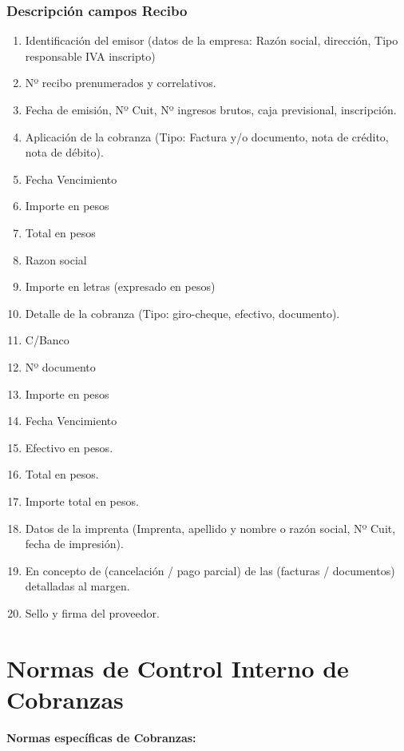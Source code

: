 \subsubsection{Descripci\'on campos Recibo}
\begin{enumerate}
\item Identificación del emisor (datos de la empresa: Razón social, dirección, Tipo responsable IVA inscripto)
\item Nº recibo prenumerados y correlativos.
\item Fecha de emisión, Nº Cuit, Nº ingresos brutos, caja previsional, inscripción.
\item Aplicación de la cobranza (Tipo: Factura y/o documento, nota de crédito, nota de débito).
\item Fecha Vencimiento
\item Importe en pesos
\item Total en pesos
\item Razon social
\item Importe en letras (expresado en pesos)
\item Detalle de la cobranza (Tipo: giro-cheque, efectivo, documento).
\item C/Banco
\item Nº documento
\item Importe en pesos
\item Fecha Vencimiento
\item Efectivo en pesos.
\item Total en pesos.
\item Importe total en pesos.
\item Datos de la  imprenta (Imprenta, apellido y nombre o razón social, Nº Cuit,  fecha de impresión).
\item En concepto de (cancelación / pago  parcial) de las (facturas / documentos) detalladas al margen.
\item Sello y firma del proveedor.
\end{enumerate}


\pagebreak
\section{Normas de Control Interno de Cobranzas}

\begin{large}
\textbf{Normas específicas de Cobranzas:}
\end{large}

